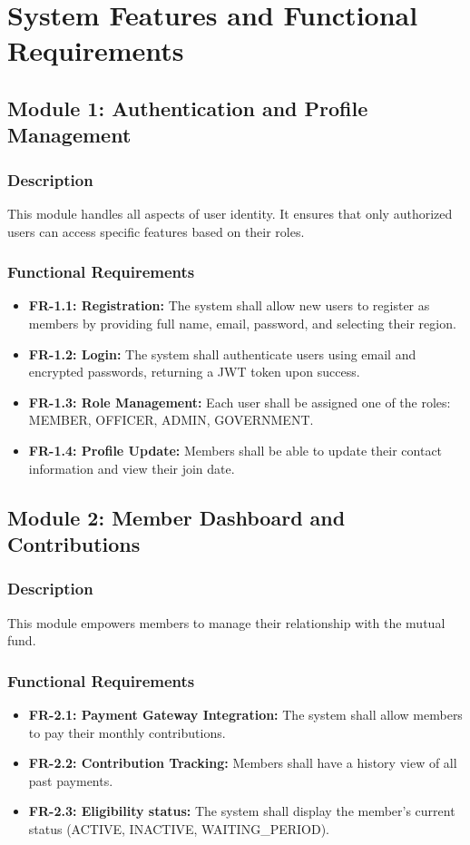 \documentclass[12pt,a4paper]{article}
\begin{document}
\section{System Features and Functional Requirements}

\subsection{Module 1: Authentication and Profile Management}

\subsubsection{Description}
This module handles all aspects of user identity. It ensures that only authorized users can access specific features based on their roles.

\subsubsection{Functional Requirements}
\begin{itemize}
    \item \textbf{FR-1.1: Registration:} The system shall allow new users to register as members by providing full name, email, password, and selecting their region.
    \item \textbf{FR-1.2: Login:} The system shall authenticate users using email and encrypted passwords, returning a JWT token upon success.
    \item \textbf{FR-1.3: Role Management:} Each user shall be assigned one of the roles: MEMBER, OFFICER, ADMIN, GOVERNMENT.
    \item \textbf{FR-1.4: Profile Update:} Members shall be able to update their contact information and view their join date.
\end{itemize}

\subsection{Module 2: Member Dashboard and Contributions}

\subsubsection{Description}
This module empowers members to manage their relationship with the mutual fund.

\subsubsection{Functional Requirements}
\begin{itemize}
    \item \textbf{FR-2.1: Payment Gateway Integration:} The system shall allow members to pay their monthly contributions.
    \item \textbf{FR-2.2: Contribution Tracking:} Members shall have a history view of all past payments.
    \item \textbf{FR-2.3: Eligibility status:} The system shall display the member's current status (ACTIVE, INACTIVE, WAITING\_PERIOD).
\end{itemize}
\end{document}
